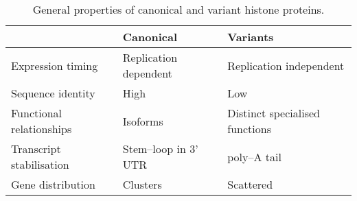   \begin{table*}
    \caption{General properties of canonical and variant histone proteins.}
    \label{tab:typical-histone-differences}
    \centering
    \begin{tabular}{l l l}
      \toprule
      \null                     & Canonical             & Variants \\
      \midrule
      Expression timing         & Replication dependent & Replication independent \\
      Sequence identity         & High                  & Low \\
      Functional relationships  & Isoforms              & Distinct specialised functions \\
      Transcript stabilisation  & Stem--loop in 3' UTR  & poly--A tail \\
      Gene distribution         & Clusters              & Scattered \\
      \bottomrule
    \end{tabular}
  \end{table*}


